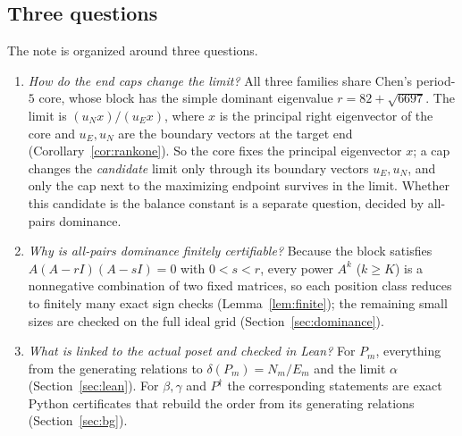 \documentclass[11pt]{amsart}
\theoremstyle{definition}
\theoremstyle{remark}
\begin{document}
\subsection*{Three questions}
The note is organized around three questions.
\begin{enumerate}
\item \emph{How do the end caps change the limit?} All three families share Chen's period-$5$ core, whose block has the simple dominant eigenvalue $r=82+\sqrt{6697}$. The limit is $(u_Nx)/(u_Ex)$, where $x$ is the principal right eigenvector of the core and $u_E,u_N$ are the boundary vectors at the target end (Corollary~\ref{cor:rankone}). So the core fixes the principal eigenvector $x$; a cap changes the \emph{candidate} limit only through its boundary vectors $u_E,u_N$, and only the cap next to the maximizing endpoint survives in the limit. Whether this candidate is the balance constant is a separate question, decided by all-pairs dominance.
\item \emph{Why is all-pairs dominance finitely certifiable?} Because the block satisfies $A(A-rI)(A-sI)=0$ with $0<s<r$, every power $A^k$ ($k\ge K$) is a nonnegative combination of two fixed matrices, so each position class reduces to finitely many exact sign checks (Lemma~\ref{lem:finite}); the remaining small sizes are checked on the full ideal grid (Section~\ref{sec:dominance}).
\item \emph{What is linked to the actual poset and checked in Lean?} For $P_m$, everything from the generating relations to $\delta(P_m)=N_m/E_m$ and the limit $\alpha$ (Section~\ref{sec:lean}). For $\beta,\gamma$ and $P^\dagger$ the corresponding statements are exact Python certificates that rebuild the order from its generating relations (Section~\ref{sec:bg}).
\end{enumerate}
\end{document}
